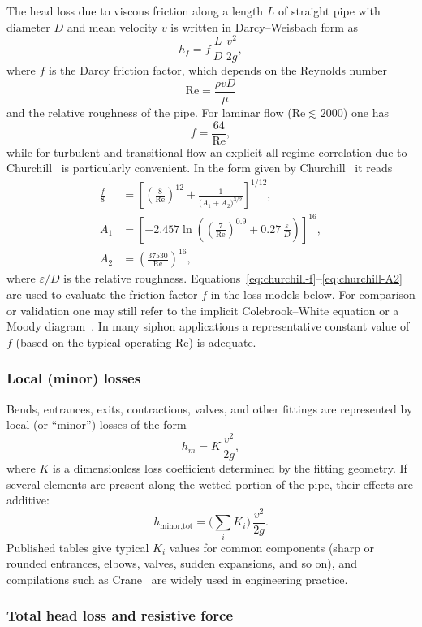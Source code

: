 \documentclass[11pt]{article}
\begin{document}
The head loss due to viscous friction along a length $L$ of straight pipe with diameter $D$
and mean velocity $v$ is written in Darcy--Weisbach form as
\[
  h_f = f\,\frac{L}{D}\,\frac{v^2}{2g},
\]
where $f$ is the Darcy friction factor, which depends on the Reynolds number
\[
  \text{Re} = \frac{\rho v D}{\mu}
\]
and the relative roughness of the pipe. For laminar flow ($\text{Re} \lesssim 2000$) one has
\[
  f = \frac{64}{\text{Re}},
\]
while for turbulent and transitional flow an explicit all-regime correlation due to
Churchill~\cite{churchill} is particularly convenient. In the form given by
Churchill~\cite{churchill} it reads
\begin{align}
  \frac{f}{8} &= \left[\left(\frac{8}{\text{Re}}\right)^{12}
  + \frac{1}{\bigl(A_1 + A_2\bigr)^{3/2}}\right]^{1/12}, \label{eq:churchill-f} \\
  A_1 &= \left[-2.457 \ln\left(\left(\frac{7}{\text{Re}}\right)^{0.9}
  + 0.27\,\frac{\varepsilon}{D}\right)\right]^{16}, \label{eq:churchill-A1} \\
  A_2 &= \left(\frac{37530}{\text{Re}}\right)^{16}, \label{eq:churchill-A2}
\end{align}
where $\varepsilon/D$ is the relative roughness.
Equations~\eqref{eq:churchill-f}--\eqref{eq:churchill-A2} are used to evaluate the friction factor $f$ in the loss models below.
For comparison or validation one may still refer to the implicit
Colebrook--White equation or a Moody diagram~\cite{colebrook,moody}.
In many siphon applications a representative constant value of $f$ (based on the typical
operating $\text{Re}$) is adequate.
\subsubsection*{Local (minor) losses}

Bends, entrances, exits, contractions, valves, and other fittings are represented by local (or
``minor'') losses of the form
\[
  h_m = K\,\frac{v^2}{2g},
\]
where $K$ is a dimensionless loss coefficient determined by the fitting geometry. If several
elements are present along the wetted portion of the pipe, their effects are additive:
\[
  h_{\text{minor,tot}} = \Big(\sum_i K_i\Big)\,\frac{v^2}{2g}.
\]
Published tables give typical $K_i$ values for common components (sharp or rounded
entrances, elbows, valves, sudden expansions, and so on), and compilations such as
Crane~\cite{crane} are widely used in engineering practice.

\subsubsection*{Total head loss and resistive force}
\end{document}
